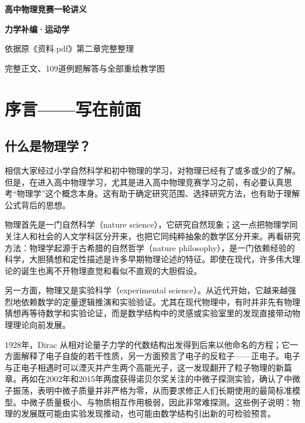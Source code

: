\frontmatter
\begin{titlepage}
  \centering
  \vspace*{0.18\textheight}
  {\bfseries 高中物理竞赛一轮讲义\par}
  \vspace{1.2em}
  {\color{DeepBlue}\bfseries 力学补编·运动学\par}
  \vspace{2.6em}
  {\large 依据原《资料.pdf》第二章完整整理\par}
  \vfill
  {\small\color{TextGray}完整正文、109道例题解答与全部重绘教学图\par}
\end{titlepage}

\tableofcontents
\clearpage

\chapter*{序言——写在前面}

\section*{什么是物理学？}

相信大家经过小学自然科学和初中物理的学习，对物理已经有了或多或少的了解。但是，在进入高中物理学习，尤其是进入高中物理竞赛学习之前，有必要认真思考“物理学”这个概念本身。这有助于确定研究范围、选择研究方法，也有助于理解公式背后的思想。

物理首先是一门自然科学（nature science），它研究自然现象；这一点把物理学同关注人和社会的人文学科区分开来，也把它同纯粹抽象的数学区分开来。再看研究方法：物理学起源于古希腊的自然哲学（nature philosophy），是一门依赖经验的科学，大胆猜想和定性描述是许多早期物理论述的特征。即使在现代，许多伟大理论的诞生也离不开物理直觉和看似不直观的大胆假设。


另一方面，物理又是实验科学（experimental science）。从近代开始，它越来越强烈地依赖数学的定量逻辑推演和实验验证。尤其在现代物理中，有时并非先有物理猜想再等待数学和实验论证，而是数学结构中的灵感或实验室里的发现直接带动物理理论向前发展。

1928年，Dirac 从相对论量子力学的代数结构出发得到后来以他命名的方程；它一方面解释了电子自旋的若干性质，另一方面预言了电子的反粒子——正电子。电子与正电子相遇时可以湮灭并产生两个高能光子，这一发现翻开了粒子物理的新篇章。再如在2002年和2015年两度获得诺贝尔奖关注的中微子探测实验，确认了中微子振荡，表明中微子质量并非严格为零，从而要求修正人们长期使用的最简标准模型。中微子质量极小、与物质相互作用极弱，因此非常难探测。这些例子说明：物理的发展既可能由实验发现推动，也可能由数学结构引出新的可检验预言。

